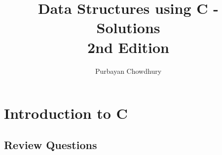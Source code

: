 \documentclass[fontsize=12pt,paper=a4]{book}
\begin{document}
\title{Data Structures using C - Solutions \\
 \large 2nd Edition}
\author{Purbayan Chowdhury}

\maketitle

\tableofcontents

\chapter{Introduction to C}

\section{Review Questions}
\end{document}
